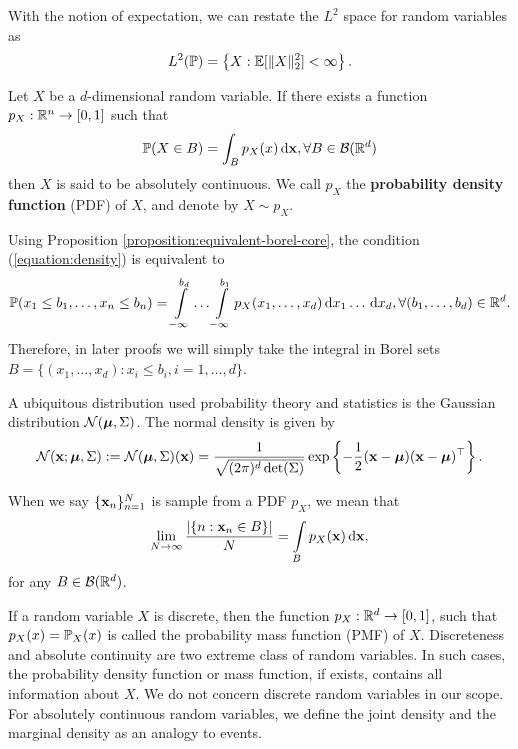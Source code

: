 With the notion of expectation, we can restate the $L^2$ space for random variables as
\begin{equation}
 L^2(\mathbb{P}) = \left\{X : \mathbb{E}[\|X\|_2^2] < \infty \right\}.
\end{equation}

\begin{definition}
 Let $X$ be a $d$-dimensional random variable. If there exists a function $p_X:\mathbb{R}^n\to [0,1]$ such that
 \begin{equation}
  \label{equation:density}
  \mathbb{P}(X\in B)=\int_B p_X(x)\,\mathrm{d} \mathbf{x}, \forall B\in \mathcal{B}(\mathbb{R}^d)
 \end{equation}
 then $X$ is said to be absolutely continuous. We call $p_X$ the \textbf{probability density function} (PDF) of $X$, and denote by $X\sim p_X$.
\end{definition}

\begin{remark}
 Using Proposition \ref{proposition:equivalent-borel-core}, the condition (\ref{equation:density}) is equivalent to
 \begin{equation}
  \mathbb{P}(x_1\le b_1, \ldots, x_n\le b_n)=\int\limits_{-\infty}^{b_d}\ldots\int\limits_{-\infty}^{b_1} p_X(x_1,\ldots,x_d)\,\mathrm{d} x_1\ldots\,\mathrm{d} x_d, \forall (b_1,\ldots,b_d)\in \mathbb{R}^d.
 \end{equation}
 Therefore, in later proofs we will simply take the integral in Borel sets $B=\{(x_1,\ldots,x_d): x_i\le b_i, i=1,\ldots,d\}$.
\end{remark}

\begin{example}
 A ubiquitous distribution used probability theory and statistics is the Gaussian distribution $\mathcal{N}(\bm{\mu}, \Sigma)$. The normal density is given by
 \begin{equation}
  \mathcal{N}(\mathbf{x};\bm{\mu}, \Sigma) := \mathcal{N}(\bm{\mu}, \Sigma)(\mathbf{x}) = \dfrac{1}{\sqrt{(2\pi)^d\det(\Sigma)}}\exp\left\{-\dfrac{1}{2}(\mathbf{x}-\bm{\mu})(\mathbf{x}-\bm{\mu})^\top\right\}.
 \end{equation}
\end{example}

\begin{remark}
 When we say $\{\mathbf{x}_n\}_{n=1}^N$ is sample from a PDF $p_X$, we mean that
 $$\lim\limits_{N\to\infty}\dfrac{|\{n: \mathbf{x}_n\in B\}|}{N} = \int\limits_{B}p_X(\mathbf{x})\,\mathrm{d}\mathbf{x},$$
 for any $B\in\mathcal{B}(\mathbb{R}^d)$.
\end{remark}

If a random variable $X$ is discrete, then the function $p_X:\mathbb{R}^d\to[0,1]$, such that $p_X(x) = \mathbb{P}_X(x)$ is called the probability mass function (PMF) of $X$. Discreteness and absolute continuity are two extreme class of random variables. In such cases, the probability density function or mass function, if exists, contains all information about $X$. We do not concern discrete random variables in our scope. For absolutely continuous random variables, we define the joint density and the marginal density as an analogy to events.

